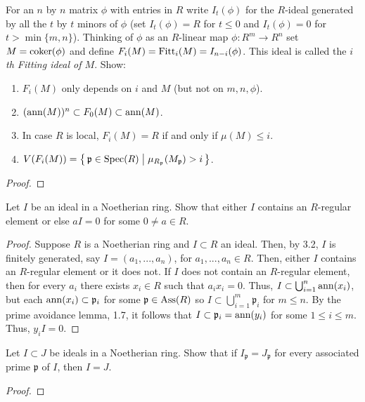 \begin{problem}
For an $n$ by $n$ matrix $\phi$ with entries in $R$ write
$I_t(\phi)$ for the $R$-ideal generated by all the $t$ by $t$
minors of $\phi$ (set $I_t(\phi)=R$ for $t\leq 0$ and
$I_t(\phi)=0$ for $t>\min\{m,n\}$). Thinking of $\phi$ as an
$R$-linear map $\phi\colon R^m\to R^n$ set $M=\operatorname{coker}(\phi)$ and
define $F_i(M)=\operatorname{Fitt}_i(M)=I_{n-i}(\phi)$. This ideal is called
the \emph{$i$th Fitting ideal of $M$}. Show:
\begin{enumerate}[label=(\alph*)]
\item $F_i(M)$ only depends on $i$ and $M$ (but not on
  $m,n,\phi$).
\item $(\operatorname{ann}(M))^n\subset F_0(M)\subset\operatorname{ann}(M)$.
\item In case $R$ is local, $F_i(M)=R$ if and only if $\mu(M)\leq
  i$.
\item
  $V(F_i(M))=
\left\{\,\mathfrak{p}\in\operatorname{Spec}(R)\;\middle|\;\mu_{R_{\mathfrak{p}}}(M_{\mathfrak{p}})>i\,\right\}$.
\end{enumerate}
\end{problem}
\begin{proof}
\end{proof}
\newpage
\begin{problem}
Let $I$ be an ideal in a Noetherian ring. Show that either $I$
contains an $R$-regular element or else $aI=0$ for some $0\neq
a\in R$.
\end{problem}
\begin{proof}
Suppose $R$ is a Noetherian ring and $I\subset R$ an ideal. Then, by
3.2, $I$ is finitely generated, say $I=(a_1,...,a_n)$, for
$a_1,...,a_n\in R$. Then, either $I$ contains an $R$-regular element
or it does not. If $I$ does not contain an $R$-regular element, then
for every $a_i$ there exists $x_i\in R$ such that $a_ix_i=0$. Thus,
$I\subset\bigcup_{i=1}^n\operatorname{ann}(x_i)$, but each
$\operatorname{ann}(x_i)\subset\mathfrak{p}_i$ for some $\mathfrak{p}\in\operatorname{Ass}(R)$ so
$I\subset\bigcup_{i=1}^m\mathfrak{p}_i$ for $m\leq n$. By the prime
avoidance lemma, 1.7, it follows that
$I\subset\mathfrak{p}_i=\operatorname{ann}(y_i)$ for some $1\leq i\leq m$. Thus,
$y_iI=0$.
\end{proof}
\newpage
\begin{problem}
Let $I\subset J$ be ideals in a Noetherian ring. Show that if
$I_{\mathfrak{p}}=J_{\mathfrak{p}}$ for every associated prime
$\mathfrak{p}$ of $I$, then $I=J$.
\end{problem}
\begin{proof}

\end{proof}
